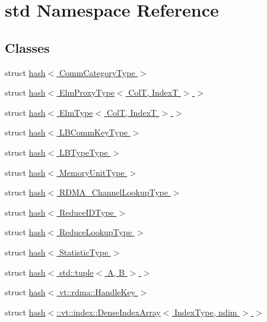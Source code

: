\hypertarget{namespacestd}{}\section{std Namespace Reference}
\label{namespacestd}
\subsection*{Classes}
\begin{DoxyCompactItemize}
\item 
struct \hyperlink{structstd_1_1hash_3_01_comm_category_type_01_4}{hash$<$ Comm\+Category\+Type $>$}
\item 
struct \hyperlink{structstd_1_1hash_3_01_elm_proxy_type_3_01_col_t_00_01_index_t_01_4_01_4}{hash$<$ Elm\+Proxy\+Type$<$ Col\+T, Index\+T $>$ $>$}
\item 
struct \hyperlink{structstd_1_1hash_3_01_elm_type_3_01_col_t_00_01_index_t_01_4_01_4}{hash$<$ Elm\+Type$<$ Col\+T, Index\+T $>$ $>$}
\item 
struct \hyperlink{structstd_1_1hash_3_01_l_b_comm_key_type_01_4}{hash$<$ L\+B\+Comm\+Key\+Type $>$}
\item 
struct \hyperlink{structstd_1_1hash_3_01_l_b_type_type_01_4}{hash$<$ L\+B\+Type\+Type $>$}
\item 
struct \hyperlink{structstd_1_1hash_3_01_memory_unit_type_01_4}{hash$<$ Memory\+Unit\+Type $>$}
\item 
struct \hyperlink{structstd_1_1hash_3_01_r_d_m_a___channel_lookup_type_01_4}{hash$<$ R\+D\+M\+A\+\_\+\+Channel\+Lookup\+Type $>$}
\item 
struct \hyperlink{structstd_1_1hash_3_01_reduce_i_d_type_01_4}{hash$<$ Reduce\+I\+D\+Type $>$}
\item 
struct \hyperlink{structstd_1_1hash_3_01_reduce_lookup_type_01_4}{hash$<$ Reduce\+Lookup\+Type $>$}
\item 
struct \hyperlink{structstd_1_1hash_3_01_statistic_type_01_4}{hash$<$ Statistic\+Type $>$}
\item 
struct \hyperlink{structstd_1_1hash_3_01std_1_1tuple_3_01_a_00_01_b_01_4_01_4}{hash$<$ std\+::tuple$<$ A, B $>$ $>$}
\item 
struct \hyperlink{structstd_1_1hash_3_01vt_1_1rdma_1_1_handle_key_01_4}{hash$<$ vt\+::rdma\+::\+Handle\+Key $>$}
\item 
struct \hyperlink{structstd_1_1hash_3_1_1vt_1_1index_1_1_dense_index_array_3_01_index_type_00_01ndim_01_4_01_4}{hash$<$\+::vt\+::index\+::\+Dense\+Index\+Array$<$ Index\+Type, ndim $>$ $>$}
\end{DoxyCompactItemize}
